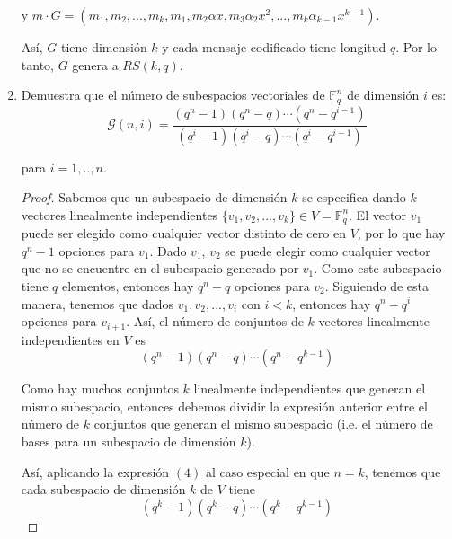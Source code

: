 \documentclass[letterpaper,11pt]{article}
\begin{document}
\begin{enumerate}
    y $m \cdot G = (m_1, m_2, ..., m_k, m_1, m_2 \alpha x, m_3 \alpha_2 x^2, ..., 
    m_k \alpha_{k-1} x^{k-1})$. 

    Así, $G$ tiene dimensión $k$ y cada mensaje codificado tiene 
    longitud $q$. Por lo tanto, $G$ genera a $RS(k, q)$. 
    
    \item Demuestra que el número de subespacios vectoriales de 
    $\mathbb{F}^{n}_{q}$ de dimensión $i$ es: 
    \begin{equation}
        \mathcal{G}(n, i) = \frac{(q^{n}-1)(q^{n}-q)\cdots(q^{n}-q^{i-1})}
        {(q^{i}-1)(q^{i}-q)\cdots(q^{i}-q^{i-1})}
    \end{equation}
    
    para $i = 1,.., n$.
    
    \begin{proof}
        Sabemos que un subespacio de dimensión $k$ se especifica dando $k$
        vectores linealmente independientes $\{v_{1}, v_{2}, ..., v_{k}\}
        \in V = \mathbb{F}^{n}_{q}$. El vector $v_{1}$ puede ser elegido como 
        cualquier vector distinto de cero en $V$, por lo que hay $q^{n}-1$ 
        opciones para $v_{1}$. Dado $v_{1}$, $v_{2}$ se puede elegir como 
        cualquier vector que no se encuentre en el subespacio generado por 
        $v_{1}$. Como este subespacio tiene $q$ elementos, entonces hay 
        $q^{n} - q$ opciones para $v_{2}$. Siguiendo de esta manera, tenemos 
        que dados $v_{1}, v_{2},..., v_{i}$ con $i < k$, entonces hay 
        $q^{n}-q^{i}$ opciones para $v_{i+1}$. Así, el número de conjuntos de 
        $k$ vectores linealmente independientes en $V$ es
        \begin{equation}
            (q^{n}-1)(q^{n}-q)\cdots(q^{n}-q^{k-1})
        \end{equation}
        
        Como hay muchos conjuntos $k$ linealmente independientes que
        generan el mismo subespacio, entonces debemos dividir la expresión
        anterior entre el número de $k$ conjuntos que generan el mismo
        subespacio (i.e. el número de bases para un subespacio de dimensión 
        $k$).
        
        Así, aplicando la expresión $(4)$ al caso especial en que $n = k$, 
        tenemos que cada subespacio de dimensión $k$ de $V$ tiene
        \begin{equation}
            (q^{k}-1)(q^{k}-q)\cdots(q^{k}-q^{k-1})
        \end{equation}
        

\end{proof}
\end{enumerate}
\end{document}
